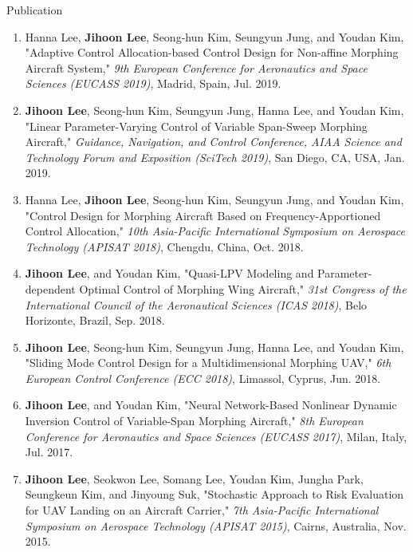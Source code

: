 \documentclass{resume}
\begin{document}
\begin{rSection}{Publication}
\begin{enumerate}
		\item Hanna Lee, \textbf{Jihoon Lee}, Seong-hun Kim, Seungyun Jung, and Youdan Kim, "Adaptive Control Allocation-based Control Design for Non-affine Morphing Aircraft System," \textit{9th European Conference for Aeronautics and Space Sciences (EUCASS 2019)}, Madrid, Spain, Jul. 2019. 
		
		\item \textbf{Jihoon Lee}, Seong-hun Kim, Seungyun Jung, Hanna Lee, and Youdan Kim, "Linear Parameter-Varying Control of Variable Span-Sweep Morphing Aircraft," \textit{Guidance, Navigation, and Control Conference, AIAA Science and Technology Forum and Exposition (SciTech 2019)}, San Diego, CA, USA, Jan. 2019. \newline[DOI: 10.2514/6.2019-0106]
		
		\item Hanna Lee, \textbf{Jihoon Lee}, Seong-hun Kim, Seungyun Jung, and Youdan Kim, "Control Design for Morphing Aircraft Based on Frequency-Apportioned Control Allocation," \textit{10th Asia-Pacific International Symposium on Aerospace Technology (APISAT 2018)}, Chengdu, China, Oct. 2018. 
		
		\item \textbf{Jihoon Lee}, and Youdan Kim, "Quasi-LPV Modeling and Parameter-dependent Optimal Control of Morphing Wing Aircraft," \textit{31st Congress of the International Council of the Aeronautical Sciences (ICAS 2018)}, Belo Horizonte, Brazil, Sep. 2018. 
		
		\item \textbf{Jihoon Lee}, Seong-hun Kim, Seungyun Jung, Hanna Lee, and Youdan Kim, "Sliding Mode Control Design for a Multidimensional Morphing UAV," \textit{6th European Control Conference (ECC 2018)}, Limassol, Cyprus, Jun. 2018. 
		
		\item \textbf{Jihoon Lee}, and Youdan Kim, "Neural Network-Based Nonlinear Dynamic Inversion Control of Variable-Span Morphing Aircraft," \textit{8th European Conference for Aeronautics and Space Sciences (EUCASS 2017)}, Milan, Italy, Jul. 2017. 
		
		\item \textbf{Jihoon Lee}, Seokwon Lee, Somang Lee, Youdan Kim, Jungha Park, Seungkeun Kim, and Jinyoung Suk, "Stochastic Approach to Risk Evaluation for UAV Landing on an Aircraft Carrier," \textit{7th Asia-Pacific International Symposium on Aerospace Technology (APISAT 2015)}, Cairns, Australia, Nov. 2015. 
		

\end{enumerate}
\end{rSection}
\end{document}
